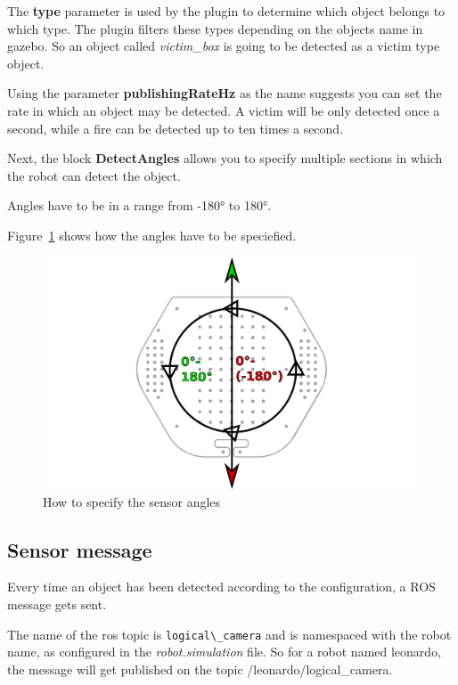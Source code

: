 The \textbf{type} parameter is used by the plugin to determine which object belongs to which type. The plugin filters these types depending on the objects name in gazebo. So an object called \textit{victim\_box} is going to be detected as a victim type object.

Using the parameter \textbf{publishingRateHz} as the name suggests you can set the rate in which an object may be detected. A victim will be only detected once a second, while a fire can be detected up to ten times a second.

Next, the block \textbf{DetectAngles} allows you to specify multiple sections in which the robot can detect the object.

Angles have to be in a range from -180° to 180°.

Figure~\ref{fig:TurtleBotSensorAngles} shows how the angles have to be speciefied.

\begin{figure}[htbp]
  \includegraphics[width=1.0\textwidth]{ttbangles.pdf}
  \caption{How to specify the sensor angles}
  \label{fig:TurtleBotSensorAngles}
\end{figure}

\subsection{Sensor message}

Every time an object has been detected according to the configuration, a ROS message gets sent.

The name of the ros topic is \verb$logical\_camera$ and is namespaced with the robot name, as configured in the \textit{robot.simulation} file. So for a robot named leonardo, the message will get published on the topic  /leonardo/logical\_camera.


